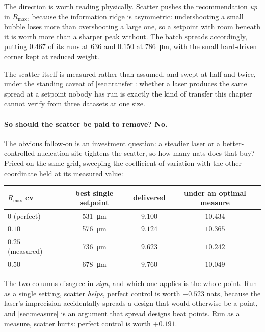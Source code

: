 \documentclass[10pt]{article}
\begin{document}
The direction is worth reading physically. Scatter pushes the recommendation \emph{up} in
$R_{\max}$, because the information ridge is asymmetric: undershooting a small bubble loses more
than overshooting a large one, so a setpoint with room beneath it is worth more than a sharper
peak without. The batch spreads accordingly, putting $0.467$ of its runs at \SI{636}{} and
$0.150$ at \SI{786}{\micro\metre}, with the small hard-driven corner kept at reduced weight.

The scatter itself is measured rather than assumed, and swept at half and twice, under the
standing caveat of \cref{sec:transfer}: whether a laser produces the same spread at a setpoint
nobody has run is exactly the kind of transfer this chapter cannot verify from three datasets at
one size.

\paragraph{So should the scatter be paid to remove? No.}
The obvious follow-on is an investment question: a steadier laser or a better-controlled
nucleation site tightens the scatter, so how many nats does that buy? Priced on the same grid,
sweeping the coefficient of variation with the other coordinate held at its measured value:

\begin{center}
\begin{tabular}{lccc}
\toprule
$R_{\max}$ cv & best single setpoint & delivered & under an optimal measure \\
\midrule
$0$ (perfect) & \SI{531}{\micro\metre} & $9.100$ & $\mathbf{10.434}$ \\
$0.10$ & \SI{576}{\micro\metre} & $9.124$ & $10.365$ \\
$0.25$ (measured) & \SI{736}{\micro\metre} & $9.623$ & $10.242$ \\
$0.50$ & \SI{678}{\micro\metre} & $9.760$ & $10.049$ \\
\bottomrule
\end{tabular}
\end{center}

\noindent The two columns disagree in \emph{sign}, and which one applies is the whole point. Run
as a single setting, scatter \emph{helps}, perfect control is worth $-0.523$ nats, because the
laser's imprecision accidentally spreads a design that would otherwise be a point, and
\cref{sec:measure} is an argument that spread designs beat points. Run as a measure, scatter
hurts: perfect control is worth $+0.191$.
\end{document}
